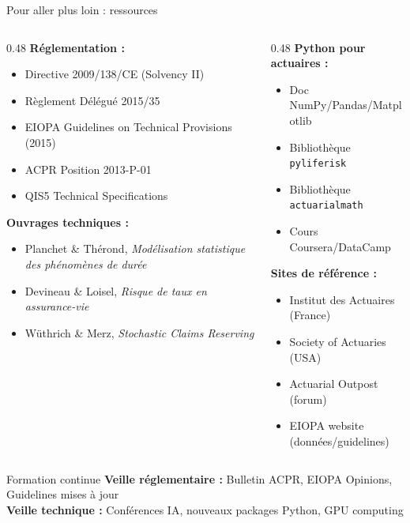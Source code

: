 \documentclass[10pt,aspectratio=169]{beamer}
\begin{document}
\begin{frame}{Pour aller plus loin : ressources}
\begin{columns}[T]
\begin{column}{0.48\textwidth}
\textbf{Réglementation :}
\begin{itemize}
    \item Directive 2009/138/CE (Solvency II)
    \item Règlement Délégué 2015/35
    \item EIOPA Guidelines on Technical Provisions (2015)
    \item ACPR Position 2013-P-01
    \item QIS5 Technical Specifications
\end{itemize}

\vspace{0.3cm}
\textbf{Ouvrages techniques :}
\begin{itemize}
    \item Planchet \& Thérond, \textit{Modélisation statistique des phénomènes de durée}
    \item Devineau \& Loisel, \textit{Risque de taux en assurance-vie}
    \item Wüthrich \& Merz, \textit{Stochastic Claims Reserving}
\end{itemize}
\end{column}
\begin{column}{0.48\textwidth}
\textbf{Python pour actuaires :}
\begin{itemize}
    \item Doc NumPy/Pandas/Matplotlib
    \item Bibliothèque \texttt{pyliferisk}
    \item Bibliothèque \texttt{actuarialmath}
    \item Cours Coursera/DataCamp
\end{itemize}

\vspace{0.3cm}
\textbf{Sites de référence :}
\begin{itemize}
    \item Institut des Actuaires (France)
    \item Society of Actuaries (USA)
    \item Actuarial Outpost (forum)
    \item EIOPA website (données/guidelines)
\end{itemize}
\end{column}
\end{columns}

\vspace{0.3cm}
\begin{block}{Formation continue}
\textbf{Veille réglementaire :} Bulletin ACPR, EIOPA Opinions, Guidelines mises à jour\\
\textbf{Veille technique :} Conférences IA, nouveaux packages Python, GPU computing
\end{block}
\end{frame}
\end{document}
